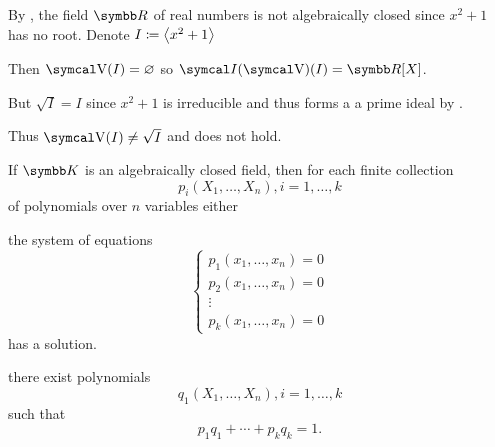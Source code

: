 \begin{example}\label{ex:geometric_nullstellensatz_does_not_hold_for_reals}
  By , the field \( \BR \) of real numbers is not algebraically closed since \( x^2 + 1 \) has no root. Denote \( I \coloneqq \left\langle x^2 + 1 \right\rangle \)

  Then \( \CV(I) = \varnothing \) so \( \Cal{I}(\CV)(I) = \BR[X] \).

  But \( \sqrt{I} = I \) since \( x^2 + 1 \) is irreducible and thus forms a a prime ideal by .

  Thus \( \CV(I) \neq \sqrt{I} \) and  does not hold.
\end{example}

\begin{corollary}\label{thm:weak_nullstellensatz}\cite{Tao:nullstellensatz}
  If \( \BK \) is an algebraically closed field, then for each finite collection
  \begin{equation*}
    p_i(X_1, \ldots, X_n), i = 1, \ldots, k
  \end{equation*}
  of polynomials over \( n \) variables either
  \begin{itemize}
     the system of equations
    \begin{equation}\label{thm:weak_nullstellensatz/system}
      \begin{cases}
        p_1(x_1, \ldots, x_n) = 0 \\
        p_2(x_1, \ldots, x_n) = 0 \\
        \vdots \\
        p_k(x_1, \ldots, x_n) = 0
      \end{cases}
    \end{equation}
    has a solution.

     there exist polynomials
    \begin{equation*}
      q_1(X_1, \ldots, X_n), i = 1, \ldots, k
    \end{equation*}
    such that
    \begin{equation*}
      p_1 q_1 + \cdots + p_k q_k = 1.
    \end{equation*}
  \end{itemize}
\end{corollary}
